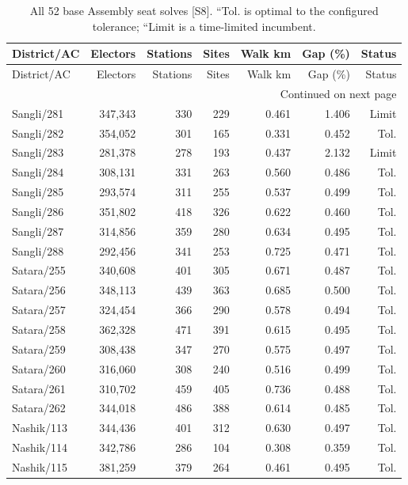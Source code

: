 \documentclass[11pt,a4paper,oneside]{report}
\begin{document}
\begin{center}
\small
\setlength{\tabcolsep}{5pt}
\begin{longtable}{lrrrrrr}
\caption{All 52 base Assembly seat solves [S8]. ``Tol. is optimal to the configured tolerance; ``Limit is a time-limited incumbent.}\\
\toprule
District/AC & Electors & Stations & Sites & Walk km & Gap (\%) & Status\\
\midrule\endfirsthead
\toprule
District/AC & Electors & Stations & Sites & Walk km & Gap (\%) & Status\\
\midrule\endhead
\midrule\multicolumn{7}{r}{\footnotesize Continued on next page}\\\endfoot
\bottomrule\endlastfoot
Sangli/281 & 347,343 & 330 & 229 & 0.461 & 1.406 & Limit\\
Sangli/282 & 354,052 & 301 & 165 & 0.331 & 0.452 & Tol.\\
Sangli/283 & 281,378 & 278 & 193 & 0.437 & 2.132 & Limit\\
Sangli/284 & 308,131 & 331 & 263 & 0.560 & 0.486 & Tol.\\
Sangli/285 & 293,574 & 311 & 255 & 0.537 & 0.499 & Tol.\\
Sangli/286 & 351,802 & 418 & 326 & 0.622 & 0.460 & Tol.\\
Sangli/287 & 314,856 & 359 & 280 & 0.634 & 0.495 & Tol.\\
Sangli/288 & 292,456 & 341 & 253 & 0.725 & 0.471 & Tol.\\
Satara/255 & 340,608 & 401 & 305 & 0.671 & 0.487 & Tol.\\
Satara/256 & 348,113 & 439 & 363 & 0.685 & 0.500 & Tol.\\
Satara/257 & 324,454 & 366 & 290 & 0.578 & 0.494 & Tol.\\
Satara/258 & 362,328 & 471 & 391 & 0.615 & 0.495 & Tol.\\
Satara/259 & 308,438 & 347 & 270 & 0.575 & 0.497 & Tol.\\
Satara/260 & 316,060 & 308 & 240 & 0.516 & 0.499 & Tol.\\
Satara/261 & 310,702 & 459 & 405 & 0.736 & 0.488 & Tol.\\
Satara/262 & 344,018 & 486 & 388 & 0.614 & 0.485 & Tol.\\
Nashik/113 & 344,436 & 401 & 312 & 0.630 & 0.497 & Tol.\\
Nashik/114 & 342,786 & 286 & 104 & 0.308 & 0.359 & Tol.\\
Nashik/115 & 381,259 & 379 & 264 & 0.461 & 0.495 & Tol.\\

\end{longtable}
\end{center}
\end{document}
